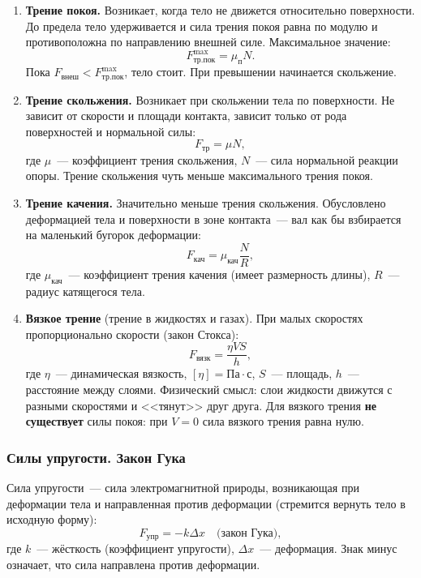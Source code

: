 \documentclass[12pt]{article}
\begin{document}
\begin{enumerate}
	\item \textbf{Трение покоя.} Возникает, когда тело не движется относительно поверхности. До предела тело удерживается и сила трения покоя равна по модулю и противоположна по направлению внешней силе. Максимальное значение:
	\[
		F_{\text{тр.пок}}^{\max} = \mu_{\text{п}} N.
	\]
	Пока $F_{\text{внеш}} < F_{\text{тр.пок}}^{\max}$, тело стоит. При превышении начинается скольжение.

	\item \textbf{Трение скольжения.} Возникает при скольжении тела по поверхности. Не зависит от скорости и площади контакта, зависит только от рода поверхностей и нормальной силы:
	\[
		F_{\text{тр}} = \mu N,
	\]
	где $\mu$~--- коэффициент трения скольжения, $N$~--- сила нормальной реакции опоры. Трение скольжения чуть меньше максимального трения покоя.

	\item \textbf{Трение качения.} Значительно меньше трения скольжения. Обусловлено деформацией тела и поверхности в зоне контакта~--- вал как бы взбирается на маленький бугорок деформации:
	\[
		F_{\text{кач}} = \mu_{\text{кач}} \frac{N}{R},
	\]
	где $\mu_{\text{кач}}$~--- коэффициент трения качения (имеет размерность длины), $R$~--- радиус катящегося тела.

	\item \textbf{Вязкое трение} (трение в жидкостях и газах). При малых скоростях пропорционально скорости (закон Стокса):
	\[
		F_{\text{вязк}} = \frac{\eta V S}{h},
	\]
	где $\eta$~--- динамическая вязкость, $[\eta] = \text{Па}\cdot\text{с}$, $S$~--- площадь, $h$~--- расстояние между слоями. Физический смысл: слои жидкости движутся с разными скоростями и <<тянут>> друг друга. Для вязкого трения \textbf{не существует} силы покоя: при $V = 0$ сила вязкого трения равна нулю.
\end{enumerate}

\subsubsection{Силы упругости. Закон Гука}

\begin{definition}
	Сила упругости~--- сила электромагнитной природы, возникающая при деформации тела и направленная против деформации (стремится вернуть тело в исходную форму):
	\[
		F_{\text{упр}} = -k \Delta x \quad \text{(закон Гука)},
	\]
	где $k$~--- жёсткость (коэффициент упругости), $\Delta x$~--- деформация. Знак минус означает, что сила направлена против деформации.
\end{definition}
\end{document}
